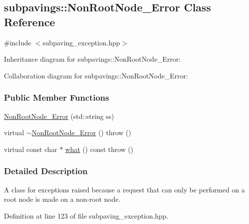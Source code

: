 \hypertarget{classsubpavings_1_1NonRootNode__Error}{\subsection{subpavings\-:\-:\-Non\-Root\-Node\-\_\-\-Error \-Class \-Reference}
\label{classsubpavings_1_1NonRootNode__Error}
}


{\ttfamily \#include $<$subpaving\-\_\-exception.\-hpp$>$}



\-Inheritance diagram for subpavings\-:\-:\-Non\-Root\-Node\-\_\-\-Error\-:


\-Collaboration diagram for subpavings\-:\-:\-Non\-Root\-Node\-\_\-\-Error\-:
\subsubsection*{\-Public \-Member \-Functions}
\begin{DoxyCompactItemize}
\item 
\hyperlink{classsubpavings_1_1NonRootNode__Error_a73cc2a8f3c2d9f20f4d4e825f968bb55}{\-Non\-Root\-Node\-\_\-\-Error} (std\-::string ss)
\item 
virtual \hyperlink{classsubpavings_1_1NonRootNode__Error_a2564fa38ce1aeea46f5754903b3fcbbf}{$\sim$\-Non\-Root\-Node\-\_\-\-Error} ()  throw ()
\item 
virtual const char $\ast$ \hyperlink{classsubpavings_1_1NonRootNode__Error_a76db530935dc8cb8cf4e06e2c858bf68}{what} () const   throw ()
\end{DoxyCompactItemize}


\subsubsection{\-Detailed \-Description}
\-A class for exceptions raised because a request that can only be performed on a root node is made on a non-\/root node. 

\-Definition at line 123 of file subpaving\-\_\-exception.\-hpp.



